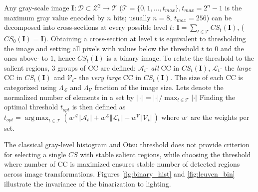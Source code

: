 \documentclass{article}
\def\I{{\mathbf I}}
\def\mcT{{\mathcal{T}}}
\def\mcD{{\mathcal{D}}}
\def\mcA{{\mathcal{A}}}
\def\mcL{{\mathcal{L}}}
\def\mcV{{\mathcal{V}}}
\DeclareMathOperator*{\argmax}{arg\,max}
\begin{document}
Any gray-scale image  $\I: \mcD \subset \mathcal{Z}^2 \rightarrow \mcT $ ($\mcT = \{0,1, ..., t_{max}\}, t_{max} = 2^n-1$ is the maximum
gray value encoded by $n$ bits; usually $n=8$, $t_{max} = 256$) can be decomposed into cross-sections at
every possible level $t$:  $\I = \sum_{t \in \mcT}CS_t(\I)$, 
($CS_0(\I) = \I$). Obtaining a cross-section at level $t$ is equivalent to thresholding the image and setting all pixels with values below the
threshold $t$ to $0$ and the ones above- to $1$, hence $CS_t(\I)$ is a binary image. 
To relate the threshold to the salient regions, $3$ groups of CC are defined: $\mcA_t$- {\em all} CC in $CS_t(\I)$, $\mcL_t$- the {\em large} CC in $CS_t(\I)$ and 
$\mcV_t$- the {\em very large} CC in $CS_t(\I)$.  The size of each CC is categorized using $\Lambda_{\mcL}$ and $\Lambda_{\mcV}$ fraction of the image size. Lets denote the normalized number of elements in a set by $\Vert \cdot \Vert = |\cdot| / \max_{t \in \mcT}|\cdot|$
Finding the optimal threshold $t_{opt}$ is then defined as
$t_{opt} = \argmax_{t \in \mcT}( w^{\mcA} \Vert \mcA_t \Vert + w^{\mcL} \Vert \mcL_t \Vert + w^{\mcV} \Vert \mcV_t \Vert )$
where $w^{\cdot}$ are the weights per set.  

The classical gray-level histogram and Otsu threshold does not provide criterion for selecting a single $CS$ with stable salient regions, while choosing the threshold where number of CC is maximized ensures stable number of detected regions across image transformations. Figures \ref{fig:binary_hist} and \ref{fig:leuven_bin} illustrate the invariance of the binarization to lighting.
 
\end{document}
